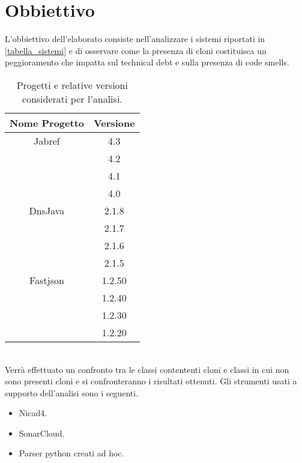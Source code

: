 \chapter{Obbiettivo}
L'obbiettivo dell'elaborato consiste nell'analizzare i sistemi riportati in \autoref{tabella_sistemi} e di osservare come la presenza di cloni costituisca un peggioramento che impatta sul technical debt e sulla presenza di code smells.
\begin{table}[h]
\begin{center}
\begin{tabular}{|c|c|}
\hline
Nome Progetto & Versione \\ \hline
Jabref & 4.3 \\ \cline{2-2}
& 4.2\\ \cline{2-2}
& 4.1\\ \cline{2-2}
& 4.0\\ \hline
DnsJava & 2.1.8 \\ \cline{2-2}
& 2.1.7\\ \cline{2-2}
& 2.1.6\\ \cline{2-2}
& 2.1.5\\ \hline
Fastjson & 1.2.50 \\ \cline{2-2}
& 1.2.40\\ \cline{2-2}
& 1.2.30\\ \cline{2-2}
& 1.2.20\\
\hline
\end{tabular}
\end{center}
\caption{Progetti e relative versioni considerati per l'analisi.}
\label{tabella_sistemi}
\end{table}
\\Verrà effettuato un confronto tra le classi contententi cloni e classi in cui non sono presenti cloni e si confronteranno i risultati ottenuti. Gli strumenti usati a supporto dell'analisi sono i seguenti.
\begin{itemize}
\item Nicad4.
\item SonarCloud.
\item Parser python creati ad hoc.
\end{itemize}